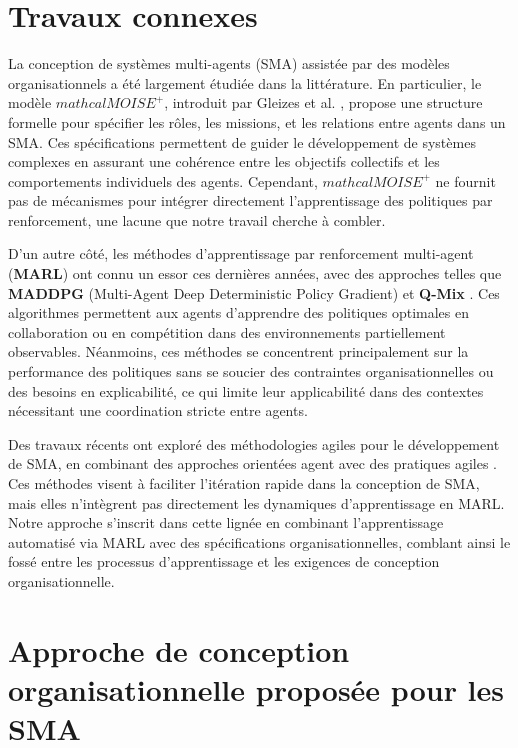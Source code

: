 \documentclass[sigconf,anonymous]{aamas}
\begin{document}
\section{Travaux connexes}
\label{sec:related_works}
La conception de systèmes multi-agents (SMA) assistée par des modèles organisationnels a été largement étudiée dans la littérature. En particulier, le modèle \textbf{$mathcal{M}OISE^+$}, introduit par Gleizes et al. \cite{gleize2008moise}, propose une structure formelle pour spécifier les rôles, les missions, et les relations entre agents dans un SMA. Ces spécifications permettent de guider le développement de systèmes complexes en assurant une cohérence entre les objectifs collectifs et les comportements individuels des agents. Cependant, $mathcal{M}OISE^+$ ne fournit pas de mécanismes pour intégrer directement l'apprentissage des politiques par renforcement, une lacune que notre travail cherche à combler.

D'un autre côté, les méthodes d'apprentissage par renforcement multi-agent (\textbf{MARL}) ont connu un essor ces dernières années, avec des approches telles que \textbf{MADDPG} (Multi-Agent Deep Deterministic Policy Gradient) \cite{lowe2017multi} et \textbf{Q-Mix} \cite{rashid2018qmix}. Ces algorithmes permettent aux agents d'apprendre des politiques optimales en collaboration ou en compétition dans des environnements partiellement observables. Néanmoins, ces méthodes se concentrent principalement sur la performance des politiques sans se soucier des contraintes organisationnelles ou des besoins en explicabilité, ce qui limite leur applicabilité dans des contextes nécessitant une coordination stricte entre agents.

Des travaux récents ont exploré des méthodologies agiles pour le développement de SMA, en combinant des approches orientées agent avec des pratiques agiles \cite{winikoff2021agile}. Ces méthodes visent à faciliter l'itération rapide dans la conception de SMA, mais elles n'intègrent pas directement les dynamiques d'apprentissage en MARL. Notre approche s'inscrit dans cette lignée en combinant l'apprentissage automatisé via MARL avec des spécifications organisationnelles, comblant ainsi le fossé entre les processus d'apprentissage et les exigences de conception organisationnelle.

\section{Approche de conception organisationnelle proposée pour les SMA}
\label{sec:apprragh}
\end{document}
